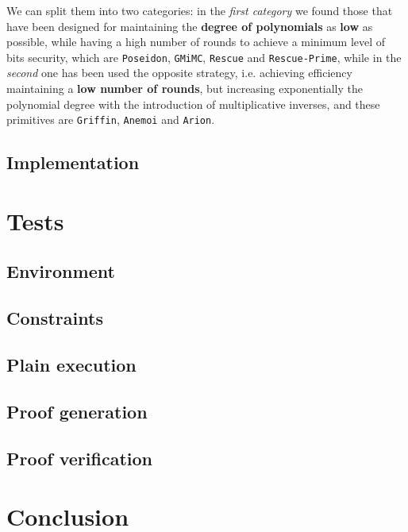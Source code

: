 \documentclass[12pt, a4paper]{report}
\begin{document}
We can split them into two categories: in the \textit{first category} we found those that have been designed for maintaining the \textbf{degree of polynomials} as \textbf{low} as possible, while having a high number of rounds to achieve a minimum level of bits security, which are \texttt{Poseidon}, \texttt{GMiMC}, \texttt{Rescue} and \texttt{Rescue-Prime}, while in the \textit{second} one has been used the opposite strategy, i.e. achieving efficiency maintaining a \textbf{low number of rounds}, but increasing exponentially the polynomial degree with the introduction of multiplicative inverses, and these primitives are \texttt{Griffin}, \texttt{Anemoi} and \texttt{Arion}.

\section{Implementation}\label{chap:implementation}

\chapter{Tests}\label{chap:tests}

\section{Environment}\label{sec:environment}

\section{Constraints}\label{sec:constraints}

\section{Plain execution}\label{sec:plain}

\section{Proof generation}\label{sec:proofgen}

\section{Proof verification}\label{sec:proofver}

\chapter{Conclusion}\label{chap:conclusion}
\end{document}
